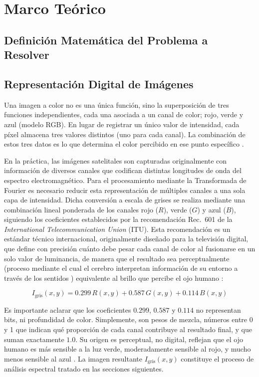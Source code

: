 \documentclass[conference]{IEEEtran}
\begin{document}
\section{Marco Teórico}

\subsection{Definición Matemática del Problema a Resolver}


\subsection{Representación Digital de Imágenes}

Una imagen a color no es una única función, sino la superposición de tres funciones independientes, cada una asociada a un canal de color; rojo, verde y azul (modelo RGB). En lugar de registrar un único valor de intensidad, cada píxel almacena tres valores distintos (uno para cada canal). La combinación de estos tres datos es lo que determina el color percibido en ese punto específico \cite{gonzalez2018}.

En la práctica, las imágenes satelitales son capturadas originalmente con
información de diversos canales que codifican distintas longitudes de onda del
espectro electromagnético. Para el procesamiento mediante la Transformada de
Fourier es necesario reducir esta representación de múltiples canales a una
sola capa de intensidad. Dicha conversión a escala de grises se realiza
mediante una combinación lineal ponderada de los canales rojo ($R$), verde
($G$) y azul ($B$), siguiendo los coeficientes establecidos por la
recomendación Rec.~601 de la \textit{International Telecommunication Union}
(ITU). Esta recomendación es un estándar técnico internacional, originalmente
diseñado para la televisión digital, que define con precisión cuánto debe
pesar cada canal de color al fusionarse en un solo valor de luminancia, de
manera que el resultado sea perceptualmente (proceso mediante el cual el cerebro interpretan información de su entorno a través de los sentidos \cite{concepto_percepcion}) equivalente al brillo que percibe el ojo humano \cite{gonzalez2018}:

\begin{equation}
    I_{\text{gris}}(x,y) = 0.299\, R(x,y) + 0.587\, G(x,y) + 0.114\, B(x,y)
    \label{eq:grises}
\end{equation}

Es importante aclarar que los coeficientes $0.299$, $0.587$ y $0.114$ no representan bits, ni profundidad de color. Simplemente, son pesos de mezcla, números entre 0 y 1 que indican qué proporción de cada canal contribuye al resultado final, y que suman exactamente $1.0$. Su origen es perceptual, no digital, reflejan que el ojo humano es
más sensible a la luz verde, moderadamente sensible al rojo, y mucho menos
sensible al azul \cite{gonzalez2018}. La imagen resultante
$I_{\text{gris}}(x,y)$ constituye el proceso de análisis espectral
tratado en las secciones siguientes.
\end{document}
